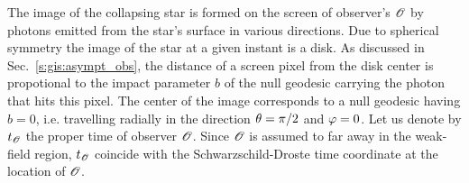 
The image of the collapsing star is formed on the screen of observer's $\mathscr{O}$
by photons emitted from the star's surface in various directions. Due to spherical
symmetry the image of the star at a given instant is a disk.
As discussed in Sec.~\ref{s:gis:asympt_obs},
the distance of a screen pixel from the disk center
is propotional to the impact parameter $b$ of the null geodesic carrying the photon
that hits this pixel.
The center of the image corresponds to a null geodesic having $b=0$, i.e.
travelling radially in the direction $\theta=\pi/2$ and $\varphi=0$.
Let us denote by $t_{\mathscr{O}}$ the proper time of observer $\mathscr{O}$. Since $\mathscr{O}$
is assumed to far away in the weak-field region, $t_{\mathscr{O}}$ coincide
with the Schwarzschild-Droste time coordinate at the location of $\mathscr{O}$.





